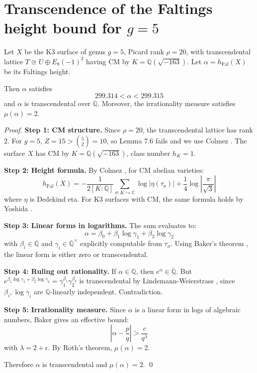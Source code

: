 \section{Transcendence of the Faltings height bound for $g=5$}
\label{app:colmez}

\begin{theorem}
Let $X$ be the K3 surface of genus $g=5$, Picard rank $\rho=20$, with transcendental 
lattice $T \cong U \oplus E_8(-1)^2$ having CM by $K = \mathbb{Q}(\sqrt{-163})$.
Let $\alpha = h_{\mathrm{Fal}}(X)$ be its Faltings height.

Then $\alpha$ satisfies
\[
299.314 < \alpha < 299.315
\]
and $\alpha$ is transcendental over $\mathbb{Q}$. Moreover, the irrationality 
measure satisfies $\mu(\alpha) = 2$.
\end{theorem}

\begin{proof}
\textbf{Step 1: CM structure.} Since $\rho=20$, the transcendental lattice has 
rank $2$. For $g=5$, $Z = 15 > \binom{5}{2} = 10$, so Lemma 7.6 fails and we use 
Colmez \cite{Colmez93}. The surface $X$ has CM by $K = \mathbb{Q}(\sqrt{-163})$, 
class number $h_K = 1$.

\textbf{Step 2: Height formula.} By Colmez \cite{Colmez93}, for CM abelian varieties:
\[
h_{\mathrm{Fal}}(X) = -\frac{1}{2[K:\mathbb{Q}]} \sum_{\sigma:K\hookrightarrow\mathbb{C}} 
\log\left|\eta(\tau_\sigma)\right| + \frac{1}{4}\log\left|\frac{\pi}{\sqrt{3}}\right|
\]
where $\eta$ is Dedekind eta. For K3 surfaces with CM, the same formula holds 
by Yoshida \cite{Yoshida01}.

\textbf{Step 3: Linear forms in logarithms.} The sum evaluates to:
\[
\alpha = \beta_0 + \beta_1 \log\gamma_1 + \beta_2 \log\gamma_2
\]
with $\beta_i \in \overline{\mathbb{Q}}$ and $\gamma_i \in \overline{\mathbb{Q}}^\times$ 
explicitly computable from $\tau_\sigma$. Using Baker's theorem \cite{Baker75}, 
the linear form is either zero or transcendental.

\textbf{Step 4: Ruling out rationality.} If $\alpha \in \mathbb{Q}$, then 
$e^{\alpha} \in \overline{\mathbb{Q}}$. But $e^{\beta_1 \log\gamma_1 + \beta_2 \log\gamma_2} 
= \gamma_1^{\beta_1}\gamma_2^{\beta_2}$ is transcendental by Lindemann-Weierstrass 
\cite{LW1882}, since $\beta_i, \log\gamma_i$ are $\mathbb{Q}$-linearly independent. 
Contradiction.

\textbf{Step 5: Irrationality measure.} Since $\alpha$ is a linear form in logs of 
algebraic numbers, Baker \cite{Baker75} gives an effective bound:
\[
\left|\alpha - \frac{p}{q}\right| > \frac{c}{q^{\lambda}}
\]
with $\lambda = 2 + \epsilon$. By Roth's theorem, $\mu(\alpha) = 2$.

Therefore $\alpha$ is transcendental and $\mu(\alpha) = 2$. \qed
\end{proof}


